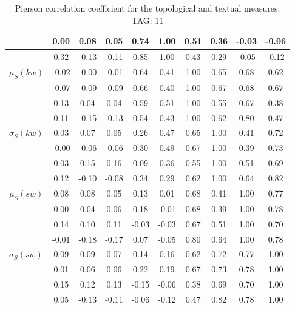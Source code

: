 \begin{table*}[h!]
\begin{center}
\begin{tabular}{| l | c | c | c | c | c | c | c | c | c |}
 & 0.00  & 0.08  & 0.05  & 0.74  & 1.00  & 0.51  & 0.36  & -0.03  & -0.06 \\\hline
 & 0.32  & -0.13  & -0.11  & 0.85  & 1.00  & 0.43  & 0.29  & -0.05  & -0.12 \\\hline
$\mu_S(kw)$ & -0.02  & -0.00  & -0.01  & 0.64  & 0.41  & 1.00  & 0.65  & 0.68  & 0.62 \\\hline
 & -0.07  & -0.09  & -0.09  & 0.66  & 0.40  & 1.00  & 0.67  & 0.68  & 0.67 \\\hline
 & 0.13  & 0.04  & 0.04  & 0.59  & 0.51  & 1.00  & 0.55  & 0.67  & 0.38 \\\hline
 & 0.11  & -0.15  & -0.13  & 0.54  & 0.43  & 1.00  & 0.62  & 0.80  & 0.47 \\\hline
$\sigma_S(kw)$ & 0.03  & 0.07  & 0.05  & 0.26  & 0.47  & 0.65  & 1.00  & 0.41  & 0.72 \\\hline
 & -0.00  & -0.06  & -0.06  & 0.30  & 0.49  & 0.67  & 1.00  & 0.39  & 0.73 \\\hline
 & 0.03  & 0.15  & 0.16  & 0.09  & 0.36  & 0.55  & 1.00  & 0.51  & 0.69 \\\hline
 & 0.12  & -0.10  & -0.08  & 0.34  & 0.29  & 0.62  & 1.00  & 0.64  & 0.82 \\\hline
$\mu_S(sw)$ & 0.08  & 0.08  & 0.05  & 0.13  & 0.01  & 0.68  & 0.41  & 1.00  & 0.77 \\\hline
 & 0.00  & 0.04  & 0.06  & 0.18  & -0.01  & 0.68  & 0.39  & 1.00  & 0.78 \\\hline
 & 0.14  & 0.10  & 0.11  & -0.03  & -0.03  & 0.67  & 0.51  & 1.00  & 0.70 \\\hline
 & -0.01  & -0.18  & -0.17  & 0.07  & -0.05  & 0.80  & 0.64  & 1.00  & 0.78 \\\hline
$\sigma_S(sw)$ & 0.09  & 0.09  & 0.07  & 0.14  & 0.16  & 0.62  & 0.72  & 0.77  & 1.00 \\\hline
 & 0.01  & 0.06  & 0.06  & 0.22  & 0.19  & 0.67  & 0.73  & 0.78  & 1.00 \\\hline
 & 0.15  & 0.12  & 0.13  & -0.15  & -0.06  & 0.38  & 0.69  & 0.70  & 1.00 \\\hline
 & 0.05  & -0.13  & -0.11  & -0.06  & -0.12  & 0.47  & 0.82  & 0.78  & 1.00 \\\hline
\end{tabular}
\caption{Pierson correlation coefficient for the topological and textual measures. TAG: 11}
\end{center}
\end{table*}